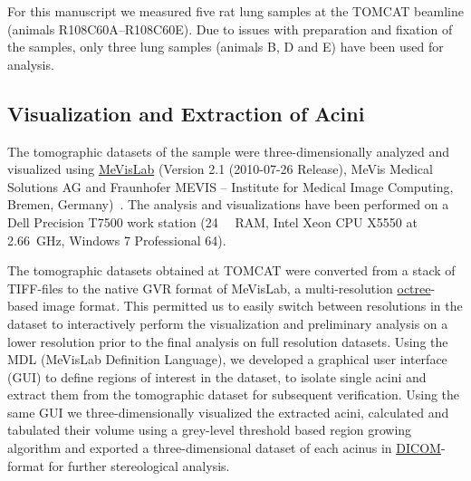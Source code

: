 \documentclass[paper=a4,abstract=true,english,DIV=calc]{scrartcl}
\begin{document}
For this manuscript we measured five rat lung samples at the TOMCAT beamline (animals R108C60A--R108C60E).
Due to issues with preparation and fixation of the samples, only three lung samples (animals B, D and E) have been used for analysis.

\subsection{Visualization and Extraction of Acini}
The tomographic datasets of the sample were three-dimensionally analyzed and visualized using \href{http://mevislab.de}{MeVisLab} (Version 2.1 (2010-07-26 Release), MeVis Medical Solutions AG and Fraunhofer MEVIS -- Institute for Medical Image Computing, Bremen, Germany)~\cite{Bitter2007}.
The analysis and visualizations have been performed on a Dell Precision T7500 work station (\SI{24}{\giga\byte} RAM, Intel Xeon CPU X5550 at \SI{2.66}{\giga\hertz}, Windows 7 Professional \SI{64}{\bit}).

The tomographic datasets obtained at TOMCAT were converted from a stack of TIFF-files to the native GVR format of MeVisLab, a multi-resolution \href{https://secure.wikimedia.org/wikipedia/en/w/index.php?title=Octree&oldid=409131920}{octree}-based image format.
This permitted us to easily switch between resolutions in the dataset to interactively perform the visualization and preliminary analysis on a lower resolution prior to the final analysis on full resolution datasets.
Using the MDL (MeVisLab Definition Language), we developed a graphical user interface (GUI) to define regions of interest in the dataset, to isolate single acini and extract them from the tomographic dataset for subsequent verification.
Using the same GUI we three-dimensionally visualized the extracted acini, calculated and tabulated their volume using a grey-level threshold based region growing algorithm and exported a three-dimensional dataset of each acinus in \href{http://en.wikipedia.org/w/index.php?title=DICOM&oldid=511155074}{DICOM}-format for further stereological analysis.
\end{document}
